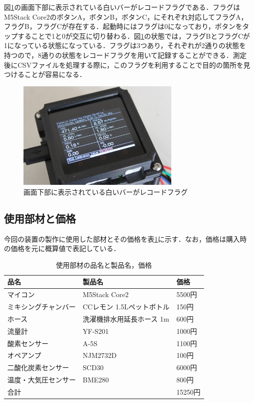 図\ref{fig:record_flag}の画面下部に表示されている白いバーがレコードフラグである．フラグはM5Stack Core2のボタンA，ボタンB，ボタンC，にそれぞれ対応してフラグA，フラグB，フラグCが存在する．起動時にはフラグは0になっており，ボタンをタップすることで1と0が交互に切り替わる．図\ref{fig:record_flag}の状態では，フラグBとフラグCが1になっている状態になっている．フラグは3つあり，それぞれが2通りの状態を持つので，8通りの状態をレコードフラグを用いて記録することができる．測定後にCSVファイルを処理する際に，このフラグを利用することで目的の箇所を見つけることが容易になる．

\begin{figure}[H]
  \begin{center}
    \includegraphics[width=8cm]{fig/record_flag}
    \caption{画面下部に表示されている白いバーがレコードフラグ}
    \label{fig:record_flag}
  \end{center}
\end{figure}

\subsection{使用部材と価格}

今回の装置の製作に使用した部材とその価格を表\ref{tb:price_of_material}に示す．なお，価格は購入時の価格を元に概算値で表記している．

\begin{table}[H]
\begin{center}
\caption{使用部材の品名と製品名，価格}
\label{tb:price_of_material}
\begin{tabular}{|l|l|l|}
\hline
品名         & 製品名              & 価格     \\ \hline
マイコン       & M5Stack Core2    & 5500円  \\ \hline
ミキシングチャンバー & CCレモン 1.5Lペットボトル & 150円   \\ \hline
ホース        & 洗濯機排水用延長ホース 1m      & 600円   \\ \hline
流量計        & YF-S201          & 1000円  \\ \hline
酸素センサー     & A-5S             & 1100円  \\ \hline
オペアンプ      & NJM2732D         & 100円   \\ \hline
二酸化炭素センサー  & SCD30            & 6000円  \\ \hline
温度・大気圧センサー & BME280           & 800円   \\ \hline
\multicolumn{2}{|l|}{合計}      & 15250円 \\ \hline
\end{tabular}
\end{center}
\end{table}

